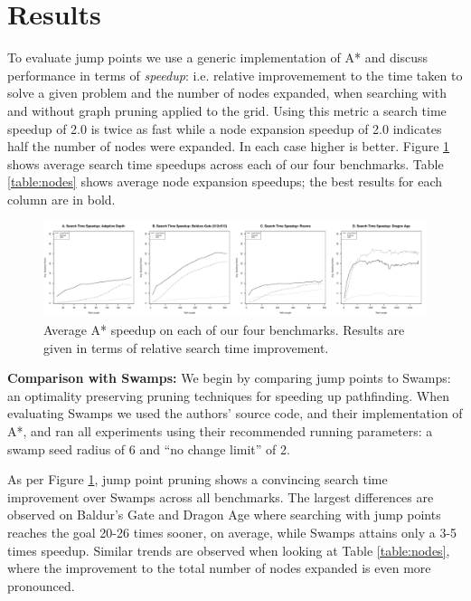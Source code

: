 \section{Results}
To evaluate jump points we use a generic implementation of A* and discuss
performance in terms of \emph{speedup}: i.e. relative improvemement to the time 
taken to solve a given problem and the number of nodes expanded, when searching
with and without graph pruning applied to the grid.
Using this metric a search time speedup
of 2.0 is twice as fast while a node expansion speedup of 2.0 indicates half the
number of nodes were expanded.  In each case higher is better.
Figure \ref{fig:speedup} shows average search time speedups across
each of our four benchmarks. Table \ref{table:nodes} shows average
node expansion speedups; the best results for each column are in bold.



\begin{figure}[t]
   \begin{center}
	   \includegraphics[width=2.0\columnwidth, trim = 10mm 10mm 10mm 0mm]
		{diagrams/speedup.pdf}
   \end{center}
   \caption{Average A* speedup on each of our four benchmarks. 
	Results are given in terms of relative search time improvement.}
\label{fig:speedup}
\end{figure}

\textbf{Comparison with Swamps: }
We begin by comparing jump points to Swamps\cite{pochter10}: an optimality
preserving pruning techniques for speeding up pathfinding.  When evaluating
Swamps we used the authors' source code, and their implementation of A*, and ran
all experiments using their recommended running parameters: a swamp seed radius
of 6 and ``no change limit'' of 2.

As per Figure \ref{fig:speedup}, jump point pruning shows a convincing search
time improvement over Swamps across all benchmarks.  The largest differences are
observed on Baldur's Gate and Dragon Age where searching with jump points
reaches the goal 20-26 times sooner, on average, while Swamps attains only a 3-5
times speedup.  Similar trends are observed when looking at Table
\ref{table:nodes}, where the improvement to the total number of nodes expanded
is even more pronounced.

